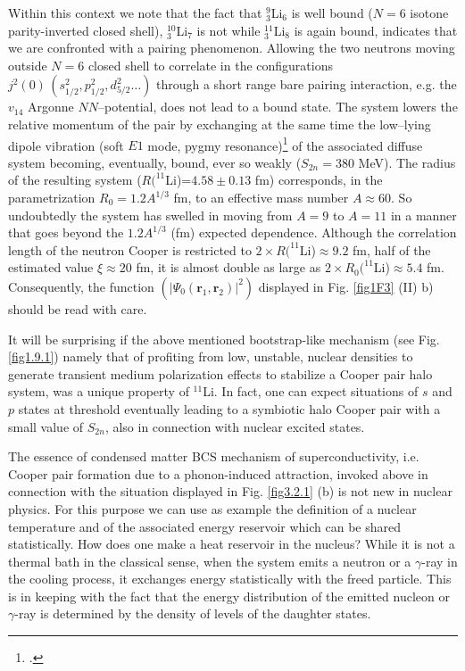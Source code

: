  Within this context we note that the fact that $^9_3$Li$_6$ is well bound ($N=6$ isotone parity-inverted closed shell), $^{10}_3$Li$_7$ is not while $^{11}_3$Li$_8$ is again bound, indicates that we are confronted with a pairing phenomenon. Allowing the two neutrons moving outside $N=6$ closed shell to correlate in the configurations $j^2(0)\, (s_{1/2}^2, p_{1/2}^2, d_{5/2}^2\dots)$ through a short range bare pairing interaction, e.g. the $v_{14}$ Argonne $NN$--potential, does not lead to a bound state. The system lowers the relative momentum of the pair by exchanging at the same time the low--lying dipole vibration (soft $E1$ mode, pygmy resonance)\footnote{\cite{Broglia:19}.} of the associated diffuse system becoming, eventually, bound, ever so weakly ($S_{2n}=380$ MeV). The radius of the resulting system ($R(^{11}$Li)=$4.58\pm 0.13$ fm) corresponds, in the parametrization $R_0=1.2 A^{1/3}$ fm, to an effective mass number $A\approx 60$. So undoubtedly the system has swelled in moving from $A=9$ to $A=11$ in a manner that goes beyond the $1.2A^{1/3}$ (fm) expected dependence. Although the correlation length of the neutron Cooper is restricted to $2\times R(^{11}$Li)$\approx 9.2$ fm, half of the estimated value $\xi\approx 20$ fm, it is almost double as large as $2\times R_0(^{11}$Li)$\approx 5.4$ fm. Consequently, the function $(|\Psi_0(\mathbf r_1,\mathbf r_2)|^2)$ displayed  in Fig. \ref{fig1F3} (II) b) should be read with care.

It will be surprising if the above mentioned  bootstrap-like mechanism (see Fig. \ref{fig1.9.1})  namely that of profiting from  low, unstable, nuclear densities to generate transient medium polarization effects to stabilize a Cooper pair halo system, was a unique property of $^{11}$Li. In fact, one can expect  situations of $s$ and $p$ states at threshold eventually leading to a symbiotic halo Cooper pair with a small value of $S_{2n}$, also in connection with  nuclear excited states. 


The essence of condensed matter BCS mechanism of superconductivity, i.e. Cooper pair formation due to a phonon-induced attraction, invoked above in connection with the situation displayed in Fig. \ref{fig3.2.1} (b) is not new in nuclear physics. For this purpose we can use as example the definition of a nuclear temperature and of the associated energy reservoir which can be shared statistically. How does one make a heat reservoir in the nucleus? While it is not a thermal bath in the classical sense, when the system emits a neutron or a $\gamma$-ray in the cooling process, it exchanges energy statistically with the freed particle. This is in keeping with the fact that the energy distribution of the emitted nucleon or $\gamma$-ray is determined by the density of levels of the daughter states.



